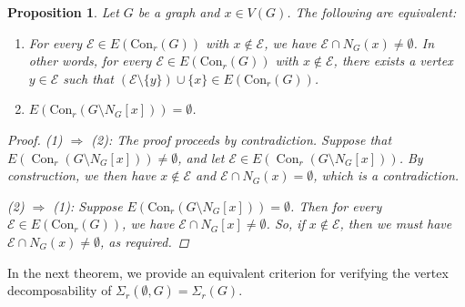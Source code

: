 \documentclass[12pt,reqno]{amsart}
\newtheorem{proposition}{Proposition}[section]
\theoremstyle{definition}
\newcommand{\Con}{{\mathrm{Con}}}
\def\E{\mathcal{E}}
\begin{document}
	
	\begin{proposition}\label{Eq. condition for a shedding vertex of Sigma_r(G)}
		Let $G$ be a graph and $x \in V(G)$. The following are equivalent:
		\begin{enumerate}
			\item For every $\E \in E(\Con_r(G))$ with $x \notin \E$, we have $\E \cap N_G(x)\neq\emptyset$. In other words, for every $\E \in E(\Con_r(G))$ with $x \notin \E$, there exists a vertex $y \in \E$ such that $(\E \setminus \{y\}) \cup \{x\} \in E(\Con_r(G))$.
			\item $E(\Con_r(G \setminus N_G[x])) = \emptyset$.
		\end{enumerate}
		\begin{proof}
			\emph{(1) $\Rightarrow$ (2):} The proof proceeds by contradiction. Suppose that $E(\operatorname{Con}_r(G \setminus N_G[x])) \neq \emptyset$, and let $\mathcal{E} \in E(\operatorname{Con}_r(G \setminus N_G[x]))$. By construction, we then have $x\notin \mathcal{E}$ and $\mathcal{E} \cap N_G(x)=\emptyset$, which is a contradiction.

			
			\medskip
			\noindent
			\emph{(2) $\Rightarrow$ (1):} Suppose $E(\Con_r(G \setminus N_G[x])) = \emptyset$. Then for every $\E \in E(\Con_r(G))$, we have $\E \cap N_G[x] \neq \emptyset$. So, if $x \notin \E$, then we must have $\E \cap N_G(x) \neq \emptyset$, as required.
		\end{proof}
	\end{proposition} 
	In the next theorem, we provide an equivalent criterion for verifying the vertex decomposability of $\Sigma_r(\emptyset,G)=\Sigma_r(G)$.
    
\end{document}
